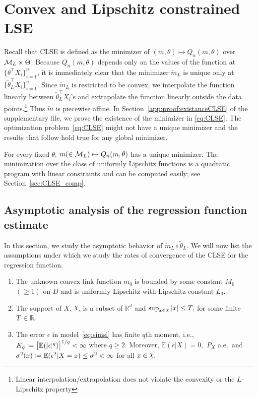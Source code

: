\section{Convex and Lipschitz constrained LSE} \label{sec:CLSE}
Recall that CLSE is defined as the minimizer of $(m, \theta) \mapsto Q_n(m, \theta)$ over $\mathcal{M}_L\times \Theta$. Because $Q_n(m, \theta)$ depends   only on the values of the function at  $\{{\theta} ^\top X_i\}_{i=1}^n$,  it is immediately clear that  the minimizer $\check{m}_{{L}}$ is  unique only at $\{\check{\theta}_{{L}} ^\top X_i\}_{i=1}^n$. Since $\check{m}_{{L}}$ is restricted to be convex, we interpolate the function linearly between $\check{\theta}_{{L}} ^\top X_i$'s  and extrapolate the function linearly outside the data points.\footnote{\label{foo:extrapolate}Linear interpolation/extrapolation does not violate the convexity or the $L$-Lipschitz property} Thus $\check{m}$ is piecewise affine. In Section~\ref{app:proof:existanceCLSE} of the supplementary file,  we prove the existence of the minimizer in \eqref{eq:CLSE}. The optimization problem~\eqref{eq:CLSE} might not have a unique minimizer and the results that follow hold true for any global minimizer. 
\begin{remark}\label{rem:compute}
 For every fixed $\theta$,  $m (\in  \mathcal{M}_L) \mapsto Q_n(m,\theta)$ has a unique minimizer. The minimization over the class of uniformly Lipschitz functions is a quadratic program with linear constraints and can be computed easily; see Section~\ref{sec:CLSE_comp}.
\end{remark}

\subsection{Asymptotic analysis of the regression function estimate}\label{sec:AsymRegFunEstimate}
In this section, we study the asymptotic behavior of $\check{m}_{{L}}\circ\check{\theta}_{{L}}$. We will now list the assumptions under which we study the rates of convergence of the CLSE for the regression function.
\begin{enumerate}[label=\bfseries (A\arabic*)]
\setcounter{enumi}{0}
\item \label{aa1_new} The unknown convex link function $m_0$ is bounded by some constant $M_0$ $ (\ge 1)$ on $D$ and is uniformly Lipschitz with Lipschitz constant $L_0$. 
\item \label{aa1} The support of $X$, $\rchi$, is a  subset of $\mathbb{R}^d$ and  $\sup_{x\in \rchi} |x| \le T,$ for some finite $T\in \mathbb{R}$.
\item \label{aa2}The error $\epsilon$ in model~\eqref{eq:simsl} has finite  $q$th moment, i.e., $K_q\coloneqq \big[\mathbb{E}(|\epsilon|^q)\big]^{1/q}  < \infty$ where $q\ge 2$. Moreover, $\mathbb{E}(\epsilon|X) = 0,$ $P_X$ a.e.~and $\sigma^2(x)\coloneqq \mathbb{E}(\epsilon^2|X=x) \le \sigma^2 < \infty$ for all $x\in \rchi.$ 

\end{enumerate}

